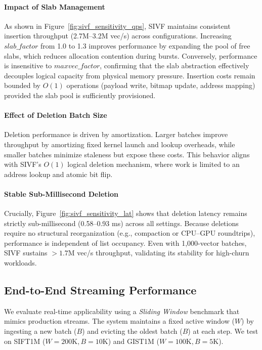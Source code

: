 \documentclass[sigconf,anonymous]{acmart}
\theoremstyle{plain}
\theoremstyle{definition}
\theoremstyle{remark}
\begin{document}
\paragraph{Impact of Slab Management}
As shown in Figure~\ref{fig:sivf_sensitivity_qps}, SIVF maintains consistent insertion throughput (2.7M--3.2M vec/s) across configurations. Increasing $slab\_factor$ from 1.0 to 1.3 improves performance by expanding the pool of free slabs, which reduces allocation contention during bursts. Conversely, performance is insensitive to $maxvec\_factor$, confirming that the slab abstraction effectively decouples logical capacity from physical memory pressure. Insertion costs remain bounded by $O(1)$ operations (payload write, bitmap update, address mapping) provided the slab pool is sufficiently provisioned.

\paragraph{Effect of Deletion Batch Size}
Deletion performance is driven by amortization. Larger batches improve throughput by amortizing fixed kernel launch and lookup overheads, while smaller batches minimize staleness but expose these costs. This behavior aligns with SIVF's $O(1)$ logical deletion mechanism, where work is limited to an address lookup and atomic bit flip.

\paragraph{Stable Sub-Millisecond Deletion}
Crucially, Figure~\ref{fig:sivf_sensitivity_lat} shows that deletion latency remains strictly sub-millisecond (0.58--0.93 ms) across all settings. Because deletions require no structural reorganization (e.g., compaction or CPU--GPU roundtrips), performance is independent of list occupancy. Even with 1,000-vector batches, SIVF sustains $>1.7$M vec/s throughput, validating its stability for high-churn workloads.

\subsection{End-to-End Streaming Performance}
\label{sec:eval_streaming}

We evaluate real-time applicability using a \textit{Sliding Window} benchmark that mimics production streams. The system maintains a fixed active window ($W$) by ingesting a new batch ($B$) and evicting the oldest batch ($B$) at each step. We test on SIFT1M ($W=200\text{K}, B=10\text{K}$) and GIST1M ($W=100\text{K}, B=5\text{K}$).
\end{document}
